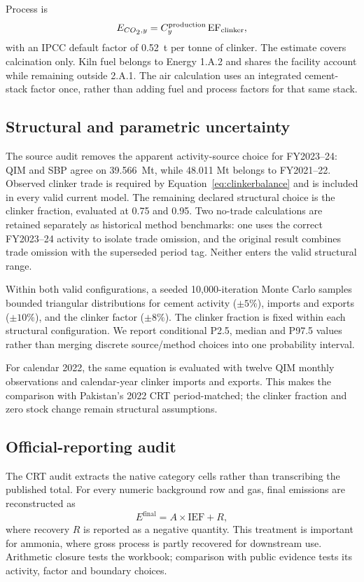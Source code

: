 Process \COtwo{} is
\begin{equation}
E_{CO\textsubscript{2}{},y}=C^{\mathrm{production}}_y\,\mathrm{EF}_{\mathrm{clinker}},
\end{equation}
with an IPCC default factor of \SI{0.52}{\tonne} \COtwo{} per tonne of clinker. The estimate
covers calcination only. Kiln fuel belongs to Energy 1.A.2 and shares the facility account while remaining outside 2.A.1. The air calculation uses an integrated cement-stack factor once, rather than adding fuel and process factors for that same stack.

\subsection{Structural and parametric uncertainty}

The source audit removes the apparent activity-source choice for FY2023--24: QIM and SBP agree
on \SI{39.566}{\mega\tonne}, while 48.011 Mt belongs to FY2021--22. Observed clinker trade is
required by Equation~\ref{eq:clinkerbalance} and is included in every valid current model.
The remaining declared structural choice is the clinker fraction, evaluated at 0.75 and 0.95.
Two no-trade calculations are retained separately as historical method benchmarks: one uses
the correct FY2023--24 activity to isolate trade omission, and the original result combines
trade omission with the superseded period tag. Neither enters the valid structural range.

Within both valid configurations, a seeded 10,000-iteration Monte Carlo samples bounded
triangular distributions for cement activity ($\pm5\%$), imports and exports ($\pm10\%$), and
the clinker factor ($\pm8\%$). The clinker fraction is fixed within each structural
configuration. We report conditional P2.5, median and P97.5 values rather than merging
discrete source/method choices into one probability interval.

For calendar 2022, the same equation is evaluated with twelve QIM monthly observations and
calendar-year clinker imports and exports. This makes the comparison with Pakistan's 2022 CRT
period-matched; the clinker fraction and zero stock change remain structural assumptions.

\subsection{Official-reporting audit}

The CRT audit extracts the native category cells rather than transcribing the published total.
For every numeric background row and gas, final emissions are reconstructed as
\begin{equation}
E^{\mathrm{final}}=A\times \mathrm{IEF}+R,
\end{equation}
where recovery $R$ is reported as a negative quantity. This treatment is important for
ammonia, where gross process \COtwo{} is partly recovered for downstream use. Arithmetic
closure tests the workbook; comparison with public evidence tests its activity, factor and
boundary choices.

